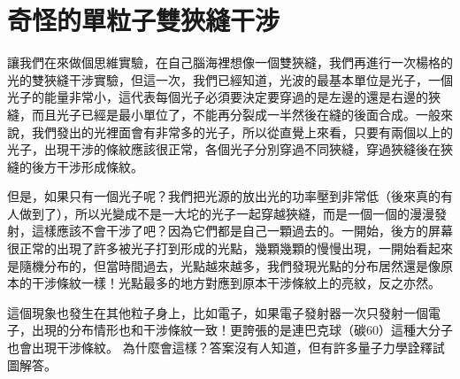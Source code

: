 \section{奇怪的單粒子雙狹縫干涉}
\noindent
\begin{minipage}{0.7\linewidth}
\setlength{\parindent}{2em}
\setlength{\parskip}{1em}
\renewcommand{\baselinestretch}{1.1}
讓我們在來做個思維實驗，在自己腦海裡想像一個雙狹縫，我們再進行一次楊格的光的雙狹縫干涉實驗，但這一次，我們已經知道，光波的最基本單位是光子，一個光子的能量非常小，這代表每個光子必須要決定要穿過的是左邊的還是右邊的狹縫，而且光子已經是最小單位了，不能再分裂成一半然後在縫的後面合成。一般來說，我們發出的光裡面會有非常多的光子，所以從直覺上來看，只要有兩個以上的光子，出現干涉的條紋應該很正常，各個光子分別穿過不同狹縫，穿過狹縫後在狹縫的後方干涉形成條紋。

但是，如果只有一個光子呢？我們把光源的放出光的功率壓到非常低（後來真的有人做到了），所以光變成不是一大坨的光子一起穿越狹縫，而是一個一個的漫漫發射，這樣應該不會干涉了吧？因為它們都是自己一顆過去的。一開始，後方的屏幕很正常的出現了許多被光子打到形成的光點，幾顆幾顆的慢慢出現，一開始看起來是隨機分布的，但當時間過去，光點越來越多，我們發現光點的分布居然還是像原本的干涉條紋一樣！光點最多的地方對應到原本干涉條紋上的亮紋，反之亦然。

這個現象也發生在其他粒子身上，比如電子，如果電子發射器一次只發射一個電子，出現的分布情形也和干涉條紋一致！更誇張的是連巴克球（碳60）這種大分子也會出現干涉條紋。
為什麼會這樣？答案沒有人知道，但有許多量子力學詮釋試圖解答。
\end{minipage}%
\hfill%
